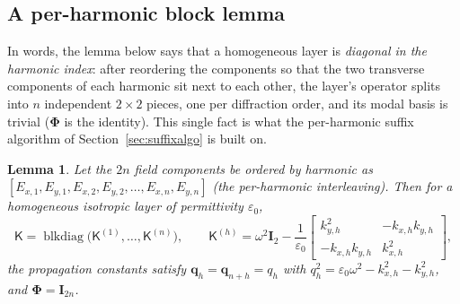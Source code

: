 \documentclass[11pt]{article}
\newtheorem{lemma}[theorem]{Lemma}
\theoremstyle{remark}
\newcommand{\eps}{\varepsilon}
\newcommand{\kp}{\mathsf{K}}
\newcommand{\Ph}{\mathbf{\Phi}}
\newcommand{\fq}{\mathbf{q}}
\newcommand{\Id}{\mathbf{I}}
\DeclareMathOperator{\blkdiag}{blkdiag}
\begin{document}
\subsection{A per-harmonic block lemma}

In words, the lemma below says that a homogeneous layer is \emph{diagonal in
the harmonic index}: after reordering the components so that the two transverse
components of each harmonic sit next to each other, the layer's operator splits
into $n$ independent $2\times2$ pieces, one per diffraction order, and its
modal basis is trivial ($\Ph$ is the identity).  This single fact is what the
per-harmonic suffix algorithm of Section~\ref{sec:suffixalgo} is built on.

\begin{lemma}\label{lem:uniform}
Let the $2n$ field components be ordered by harmonic as
$[E_{x,1},E_{y,1},E_{x,2},E_{y,2},\dots,E_{x,n},E_{y,n}]$
(the per-harmonic interleaving). Then for a homogeneous isotropic layer of
permittivity $\eps_0$,
\begin{equation}
\kp=\blkdiag\big(\kp^{(1)},\dots,\kp^{(n)}\big),\qquad
\kp^{(h)}=\omega^2\Id_2-\frac{1}{\eps_0}
\begin{bmatrix}k_{y,h}^2 & -k_{x,h}k_{y,h}\\
-k_{x,h}k_{y,h} & k_{x,h}^2\end{bmatrix},
\label{eq:kpblock}
\end{equation}
the propagation constants satisfy $\fq_h=\fq_{n+h}=q_h$ with
$q_h^2=\eps_0\omega^2-k_{x,h}^2-k_{y,h}^2$, and $\Ph=\Id_{2n}$.
\end{lemma}
\end{document}
